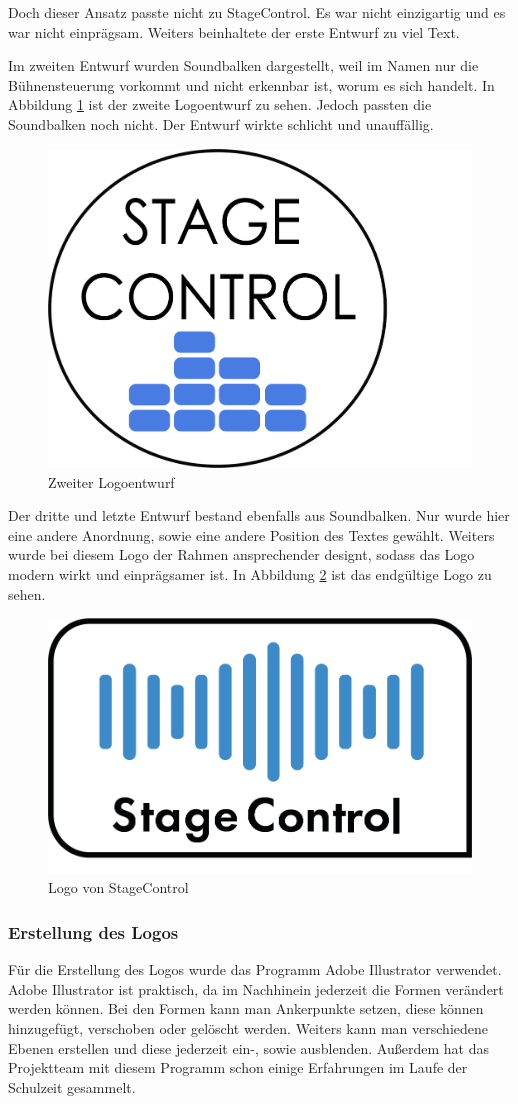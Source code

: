 Doch dieser Ansatz passte nicht zu StageControl. Es war nicht einzigartig und es war nicht einprägsam. Weiters beinhaltete der erste Entwurf zu viel Text. 

\newpage
Im zweiten Entwurf wurden Soundbalken dargestellt, weil im Namen nur die Bühnensteuerung vorkommt und nicht erkennbar ist, worum es sich handelt. In Abbildung \ref{fig:Logoentwurf2} ist der zweite Logoentwurf zu sehen. Jedoch passten die Soundbalken noch nicht. Der Entwurf wirkte schlicht und unauffällig. 

\begin{figure}[H]
	\centering
	\includegraphics[width=0.5\linewidth]{images/Logoentwurf2.png}
	\caption[Zweiter Logoentwurf]{Zweiter Logoentwurf}
	\label{fig:Logoentwurf2}
\end{figure}

Der dritte und letzte Entwurf bestand ebenfalls aus Soundbalken. Nur wurde hier eine andere Anordnung, sowie eine andere Position des Textes gewählt. Weiters wurde bei diesem Logo der Rahmen ansprechender designt, sodass das Logo modern wirkt und einprägsamer ist. In Abbildung \ref{fig:Logo StageControl} ist das endgültige Logo zu sehen.

\begin{figure}[H]
	\centering
	\includegraphics[width=0.5\linewidth]{images/Logo StageControl.png}
	\caption[Logo von StageControl]{Logo von StageControl}
	\label{fig:Logo StageControl}
\end{figure}

\newpage
\subsubsection{Erstellung des Logos}
Für die Erstellung des Logos wurde das Programm Adobe Illustrator verwendet. Adobe Illustrator ist praktisch, da im Nachhinein jederzeit die Formen verändert werden können. Bei den Formen kann man Ankerpunkte setzen, diese können hinzugefügt, verschoben oder gelöscht werden. Weiters kann man verschiedene Ebenen erstellen und diese jederzeit ein-, sowie ausblenden. Außerdem hat das Projektteam mit diesem Programm schon einige Erfahrungen im Laufe der Schulzeit gesammelt. 

